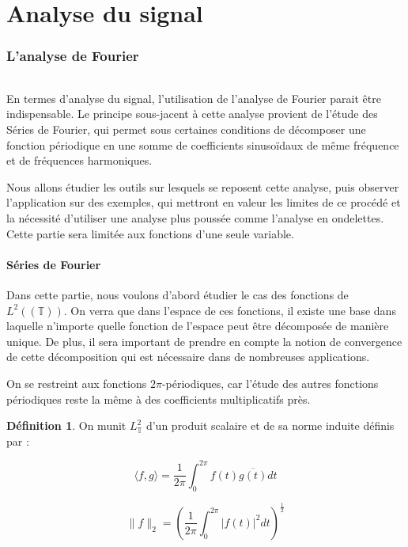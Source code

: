 \documentclass[]{article}
\theoremstyle{remark}
\theoremstyle{definition}
\newtheorem{mydef}{Définition}
\begin{document}
	\part{Analyse du signal}
	\section{L'analyse de Fourier}

	\paragraph*{}
En termes d'analyse du signal, l'utilisation de l'analyse de Fourier parait être indispensable. Le principe sous-jacent à cette analyse provient de l'étude des Séries de Fourier, qui permet sous certaines conditions de décomposer une fonction périodique en une somme de coefficients sinusoïdaux de même fréquence et de fréquences harmoniques. 


Nous allons étudier les outils sur lesquels se reposent cette analyse, puis observer l'application sur des exemples, qui mettront en valeur les limites de ce procédé et la nécessité d'utiliser une analyse plus poussée comme l'analyse en ondelettes. Cette partie sera limitée aux fonctions d'une seule variable. 

	
	\subsection {Séries de Fourier}
		Dans cette partie, nous voulons d'abord étudier le cas des fonctions de $L^2(\mathbb{(T)})$. On verra que dans l'espace de ces fonctions, il existe une base dans laquelle n'importe quelle fonction de l'espace peut être décomposée de manière unique. De plus, il sera important de prendre en compte la notion de convergence de cette décomposition qui est nécessaire dans de nombreuses applications. 

		On se restreint aux fonctions $2\pi$-périodiques, car l'étude des autres fonctions périodiques reste la même à des coefficients multiplicatifs près. 	
		
			
		\begin{mydef} 
			
			On munit $L^2_{\mathbb{T}}$ d'un produit scalaire et de sa norme induite définis par : 
			
			
			$$ \langle f,g \rangle = \frac{1}{2\pi} \int_{0}^{2\pi} f(t) \overline{g(t)} dt$$
				
			$$ \| f \|_2 =  \left( \frac{1}{2\pi} \int_0^{2\pi}| f(t) |^2 dt\right)^{\frac{1}{2}}$$	
				
		\end{mydef}		 
		 
\end{document}

